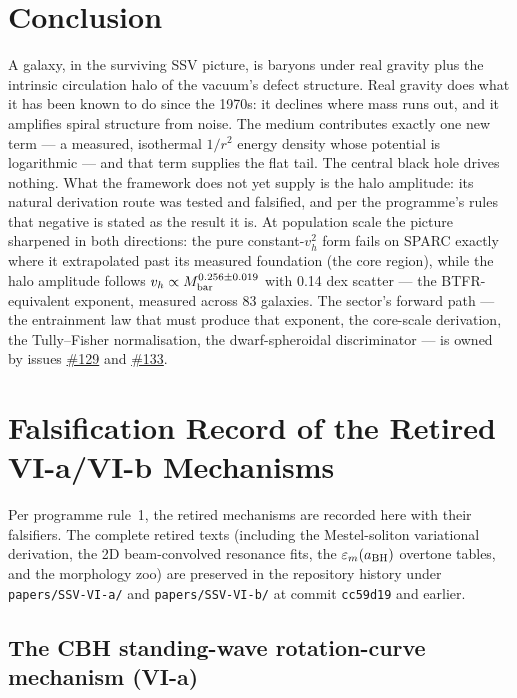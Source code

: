 \documentclass[11pt,a4paper]{article}
\providecommand{\ssvissue}[1]{\hyperref[issue:#1]{\##1}}
\begin{document}
\section{Conclusion}

A galaxy, in the surviving SSV picture, is baryons under real gravity
plus the intrinsic circulation halo of the vacuum's defect structure.
Real gravity does what it has been known to do since the 1970s: it
declines where mass runs out, and it amplifies spiral structure from
noise.  The medium contributes exactly one new term --- a measured,
isothermal $1/r^2$ energy density whose potential is logarithmic --- and
that term supplies the flat tail.  The central black hole drives
nothing.  What the framework does not yet supply is the halo amplitude:
its natural derivation route was tested and falsified, and per the
programme's rules that negative is stated as the result it is.  At
population scale the picture sharpened in both directions: the pure
constant-$v_h^2$ form fails on SPARC exactly where it extrapolated past
its measured foundation (the core region), while the halo amplitude
follows $v_h \propto M_{\rm bar}^{0.256\pm0.019}$ with 0.14 dex scatter
--- the BTFR-equivalent exponent, measured across 83 galaxies.  The
sector's forward path --- the entrainment law that must produce that
exponent, the core-scale derivation, the Tully--Fisher
normalisation, the dwarf-spheroidal discriminator --- is owned by
issues \ssvissue{129} and \ssvissue{133}.

\appendix
\section{Falsification Record of the Retired VI-a/VI-b Mechanisms}
\label{app:record}

Per programme rule~1, the retired mechanisms are recorded here with their
falsifiers.  The complete retired texts (including the Mestel-soliton
variational derivation, the 2D beam-convolved resonance fits, the
$\varepsilon_m(a_{\rm BH})$ overtone tables, and the morphology zoo) are
preserved in the repository history under \texttt{papers/SSV-VI-a/} and
\texttt{papers/SSV-VI-b/} at commit \texttt{cc59d19} and earlier.

\subsection{The CBH standing-wave rotation-curve mechanism (VI-a)}
\end{document}

